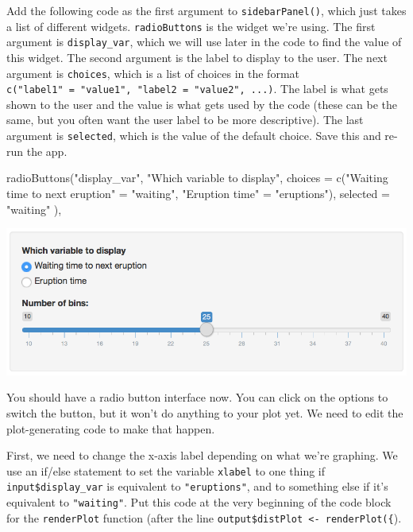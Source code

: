 \documentclass[
]{book}
\newenvironment{Shaded}{\begin{snugshade}}{\end{snugshade}}
\newcommand{\AttributeTok}[1]{\textcolor[rgb]{0.77,0.63,0.00}{#1}}
\newcommand{\FunctionTok}[1]{\textcolor[rgb]{0.00,0.00,0.00}{#1}}
\newcommand{\NormalTok}[1]{#1}
\newcommand{\OtherTok}[1]{\textcolor[rgb]{0.56,0.35,0.01}{#1}}
\newcommand{\StringTok}[1]{\textcolor[rgb]{0.31,0.60,0.02}{#1}}
\begin{document}
Add the following code as the first argument to \texttt{sidebarPanel()}, which just takes a list of different widgets. \texttt{radioButtons} is the widget we're using. The first argument is \texttt{display\_var}, which we will use later in the code to find the value of this widget. The second argument is the label to display to the user. The next argument is \texttt{choices}, which is a list of choices in the format \texttt{c("label1"\ =\ "value1",\ "label2\ =\ "value2",\ ...)}. The label is what gets shown to the user and the value is what gets used by the code (these can be the same, but you often want the user label to be more descriptive). The last argument is \texttt{selected}, which is the value of the default choice. Save this and re-run the app.

\begin{Shaded}
\begin{Highlighting}[]
         \FunctionTok{radioButtons}\NormalTok{(}\StringTok{"display\_var"}\NormalTok{,}
                      \StringTok{"Which variable to display"}\NormalTok{,}
                      \AttributeTok{choices =} \FunctionTok{c}\NormalTok{(}\StringTok{"Waiting time to next eruption"} \OtherTok{=} \StringTok{"waiting"}\NormalTok{,}
                                  \StringTok{"Eruption time"} \OtherTok{=} \StringTok{"eruptions"}\NormalTok{),}
                      \AttributeTok{selected =} \StringTok{"waiting"}
\NormalTok{         ),}
\end{Highlighting}
\end{Shaded}

\includegraphics{images/demo_app/08-radiobutton-widget.png}

You should have a radio button interface now. You can click on the options to switch the button, but it won't do anything to your plot yet. We need to edit the plot-generating code to make that happen.

First, we need to change the x-axis label depending on what we're graphing. We use an if/else statement to set the variable \texttt{xlabel} to one thing if \texttt{input\$display\_var} is equivalent to \texttt{"eruptions"}, and to something else if it's equivalent to \texttt{"waiting"}. Put this code at the very beginning of the code block for the \texttt{renderPlot} function (after the line \texttt{output\$distPlot\ \textless{}-\ renderPlot(\{}).
\end{document}
